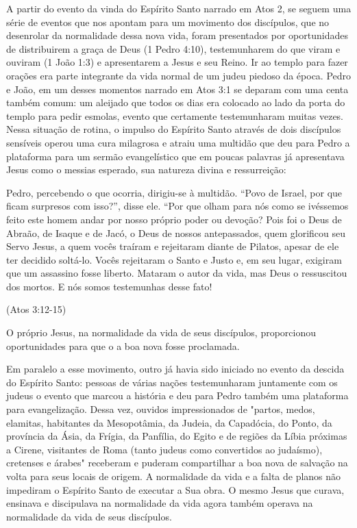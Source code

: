 \documentclass[
	12pt,				%
	openright,			%
	twoside,			%
	a4paper,			%
	english,			%
	french,				%
	spanish,			%
	brazil				%
	]{abntex2}
\begin{document}
{A partir do evento da vinda do Espírito Santo narrado em Atos 2, se seguem uma série de eventos que nos apontam para um movimento dos discípulos, que no desenrolar da normalidade dessa nova vida, foram presentados por oportunidades de distribuirem a graça de Deus (1 Pedro 4:10), testemunharem do que viram e ouviram (1 João 1:3) e apresentarem a Jesus e seu Reino. Ir ao templo para fazer orações era parte integrante da vida normal de um judeu piedoso da época. Pedro e João, em um desses momentos narrado em Atos 3:1 se deparam com uma centa também comum: um aleijado que todos os dias era colocado ao lado da porta do templo para pedir esmolas, evento que certamente testemunharam muitas vezes. Nessa situação de rotina, o impulso do Espírito Santo através de dois discípulos sensíveis operou uma cura milagrosa e atraiu uma multidão que deu para Pedro a plataforma para um sermão evangelístico que em poucas palavras já apresentava Jesus como o messias esperado, sua natureza divina e ressurreição:

\begin{citacao}
	Pedro, percebendo o que ocorria, dirigiu-se à multidão. “Povo de Israel, por que ficam surpresos com isso?”, disse ele. “Por que olham para nós como se ivéssemos feito este homem andar por nosso próprio poder ou devoção? Pois foi o Deus de Abraão, de Isaque e de Jacó, o Deus de nossos antepassados, quem glorificou seu Servo Jesus, a quem vocês traíram e rejeitaram diante de Pilatos,
	apesar de ele ter decidido soltá-lo. Vocês rejeitaram o Santo e Justo e, em seu lugar, exigiram que um assassino fosse liberto. Mataram o autor da vida, mas Deus o ressuscitou dos mortos. E nós somos testemunhas desse fato!
\end{citacao}(Atos 3:12-15)

O próprio Jesus, na normalidade da vida de seus discípulos, proporcionou oportunidades para que o a boa nova fosse proclamada. 

Em paralelo a esse movimento, outro já havia sido iniciado no evento da descida do Espírito Santo: pessoas de várias nações testemunharam juntamente com os judeus o evento que marcou a história e deu para Pedro também uma plataforma para evangelização. Dessa vez, ouvidos impressionados de "partos, medos, elamitas, habitantes da Mesopotâmia, da Judeia, da Capadócia, do Ponto, da província da Ásia, da Frígia, da Panfília, do Egito e de regiões da Líbia próximas a Cirene, visitantes de Roma (tanto judeus como convertidos ao judaísmo), cretenses e árabes" receberam e puderam compartilhar a boa nova de salvação na volta para seus locais de origem. A normalidade da vida e a falta de planos não impediram o Espírito Santo de executar a Sua obra. O mesmo Jesus que curava, ensinava e discipulava na normalidade da vida agora também operava na normalidade da vida de seus discípulos.

}
\end{document}
